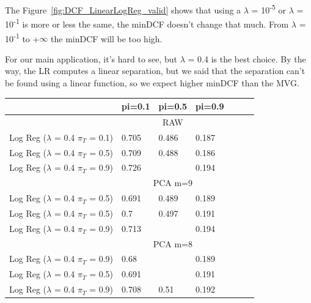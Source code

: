 \documentclass[english]{report}
\begin{document}
The Figure~\ref{fig:DCF_LinearLogReg_valid} shows that using a $\lambda$ = 10\textsuperscript{-5} or $\lambda$ = 10\textsuperscript{-1}
is more or less the same, the minDCF doesn't change that much.
From $\lambda$ = 10\textsuperscript{-1} to +$\infty$ the minDCF will be too high.

For our main application, it's hard to see, but $\lambda$ = 0.4 is the best choice. By the way, the LR computes a linear separation,
but we said that the separation can't be found using a linear function, so we expect higher minDCF than the MVG.

\begin{table}[H]
    \centering
    \begin{tabular}{lllllll}
        \toprule
                                            & pi=0.1 & pi=0.5 & pi=0.9 \\ \midrule
                                & \multicolumn{3}{c}{RAW}  \\
    Log Reg ($\lambda$ = 0.4 $\pi_T$ = 0.1)   & 0.705  & 0.486 & 0.187  \\ \midrule
    Log Reg ($\lambda$ = 0.4 $\pi_T$ = 0.5)   & 0.709      & 0.488      & 0.186  \\ \midrule
    Log Reg ($\lambda$ = 0.4 $\pi_T$ = 0.9)   &  0.726     &  \color{red}{0.506}     & 0.194  \\ \midrule
                                & \multicolumn{3}{c}{PCA m=9}  \\
    Log Reg ($\lambda$ = 0.4 $\pi_T$ = 0.5)   & 0.691      & 0.489      & 0.189 \\ \midrule
    Log Reg ($\lambda$ = 0.4 $\pi_T$ = 0.5)   & 0.7      & 0.497      & 0.191  \\ \midrule
    Log Reg ($\lambda$ = 0.4 $\pi_T$ = 0.9)   & 0.713      & \color{red}{0.506}      & 0.194  \\ \midrule
                                & \multicolumn{3}{c}{PCA m=8}  \\
    Log Reg ($\lambda$ = 0.4 $\pi_T$ = 0.9)   & 0.68      & \color{red}{0.48}      & 0.189 \\ \midrule
    Log Reg ($\lambda$ = 0.4 $\pi_T$ = 0.5)   &  0.691     &  \color{red}{0.483}     & 0.191  \\ \midrule
    Log Reg ($\lambda$ = 0.4 $\pi_T$ = 0.9)   &  0.708     & 0.51      & 0.192  \\ 
    \bottomrule
    \end{tabular}
    \label{tab:LinearLogReg_valid}
\end{table}
\end{document}
